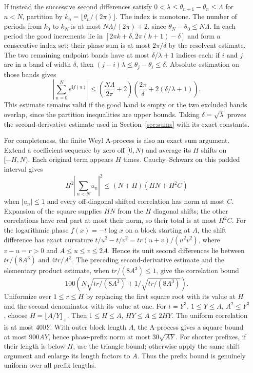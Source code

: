 \documentclass[11pt,a4paper]{article}
\numberwithin{equation}{section}
\theoremstyle{definition}
\newcommand{\ii}{\mathrm i}
\begin{document}
If instead the successive second differences satisfy
$0<\lambda\le\theta_{n+1}-\theta_n\le\Lambda$ for $n<N$, partition by
$k_n=\lfloor\theta_n/(2\pi)\rfloor$.
The index is monotone. The number of periods from $k_0$ to $k_N$ is at most
$N\Lambda/(2\pi)+2$, since $\theta_N-\theta_0\le N\Lambda$.
In each period the good increments lie in
$[2\pi k+\delta,2\pi(k+1)-\delta]$ and form a consecutive index set;
their phase sum is at most $2\pi/\delta$ by the resolvent estimate.
The two remaining endpoint bands have at most $\delta/\lambda+1$ indices
each: if $i$ and $j$ are in a band of width $\delta$, then
$(j-i)\lambda\le\theta_j-\theta_i\le\delta$.
Absolute estimation on those bands gives
\[
 \left|\sum_{n=0}^N e^{\ii f(n)}\right|
 \le\left(\frac{N\Lambda}{2\pi}+2\right)
                \left(\frac{2\pi}{\delta}+2(\delta/\lambda+1)\right).
\]
This estimate remains valid if the good band is empty or the two excluded
bands overlap, since the partition inequalities are upper bounds.
Taking $\delta=\sqrt\lambda$ proves the second-derivative estimate used in
Section~\ref{sec:sums} with its exact constants.

For completeness, the finite Weyl A-process is also an exact sum argument.
Extend a coefficient sequence by zero off $[0,N)$ and average its $H$ shifts
on $[-H,N)$. Each original term appears $H$ times.
Cauchy--Schwarz on this padded interval gives
\[
 H^2\left|\sum_{n<N}a_n\right|^2
 \le(N+H)\left(HN+H^2C\right)
\]
when $|a_n|\le1$ and every off-diagonal shifted correlation has norm at most
$C$. Expansion of the square supplies $HN$ from the $H$ diagonal shifts;
the other correlations have real part at most their norm, so their total is
at most $H^2C$.
For the logarithmic phase $f(x)=-t\log x$ on a block starting at $A$, the
shift difference has exact curvature
$t/u^2-t/v^2=tr(u+v)/(u^2v^2)$, where $v-u=r>0$ and
$A\le u\le v\le2A$. Hence its unit second differences lie between
$tr/(8A^3)$ and $4tr/A^3$. The preceding second-derivative estimate and the elementary
product estimate, when $tr/(8A^3)\le1$, give the correlation bound
\[
 100\left(N\sqrt{tr/(8A^3)}+1/\sqrt{tr/(8A^3)}\right).
\]
Uniformize over $1\le r\le H$ by replacing the first square root with its
value at $H$ and the second denominator with its value at one.
For $t=Y^3$, $1\le Y\le A$, $A^2\le Y^3$, choose
$H=\lfloor A/Y\rfloor_+$. Then $1\le H\le A$,
$HY\le A\le2HY$. The uniform correlation is at most $400Y$.
With outer block length $A$, the A-process gives a square bound at most
$900AY$, hence phase-prefix norm at most $30\sqrt{AY}$. For shorter
prefixes, if their length is below $H$, use the triangle bound; otherwise
apply the same shift argument and enlarge its length factors to $A$.
Thus the prefix bound is genuinely uniform over all prefix lengths.
\end{document}
